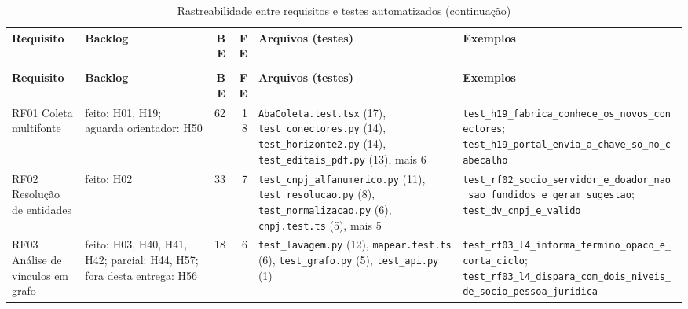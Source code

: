 \begin{scriptsize}
\begin{longtable}{>{\raggedright\arraybackslash}p{2.5cm}>{\raggedright\arraybackslash}p{1.9cm}rr>{\raggedright\arraybackslash}p{3.3cm}>{\raggedright\arraybackslash}p{4.5cm}}
\caption{Rastreabilidade entre requisitos e testes automatizados}\label{tab:rastreabilidade-testes}\\
\hline
\textbf{Requisito} & \textbf{Backlog} & \textbf{BE} & \textbf{FE} & \textbf{Arquivos (testes)} & \textbf{Exemplos} \\ \hline\endfirsthead
\caption[]{Rastreabilidade entre requisitos e testes automatizados (continuação)}\\
\hline
\textbf{Requisito} & \textbf{Backlog} & \textbf{BE} & \textbf{FE} & \textbf{Arquivos (testes)} & \textbf{Exemplos} \\ \hline\endhead
RF01 Coleta multifonte & feito: H01, H19; aguarda orientador: H50 & 62 & 18 & \texttt{AbaColeta.\allowbreak{}test.\allowbreak{}tsx} (17), \texttt{test\_\allowbreak{}conectores.\allowbreak{}py} (14), \texttt{test\_\allowbreak{}horizonte2.\allowbreak{}py} (14), \texttt{test\_\allowbreak{}editais\_\allowbreak{}pdf.\allowbreak{}py} (13), mais 6 & \texttt{test\_\allowbreak{}h19\_\allowbreak{}fabrica\_\allowbreak{}conhece\_\allowbreak{}os\_\allowbreak{}novos\_\allowbreak{}conectores}; \texttt{test\_\allowbreak{}h19\_\allowbreak{}portal\_\allowbreak{}envia\_\allowbreak{}a\_\allowbreak{}chave\_\allowbreak{}so\_\allowbreak{}no\_\allowbreak{}cabecalho} \\
RF02 Resolução de entidades & feito: H02 & 33 & 7 & \texttt{test\_\allowbreak{}cnpj\_\allowbreak{}alfanumerico.\allowbreak{}py} (11), \texttt{test\_\allowbreak{}resolucao.\allowbreak{}py} (8), \texttt{test\_\allowbreak{}normalizacao.\allowbreak{}py} (6), \texttt{cnpj.\allowbreak{}test.\allowbreak{}ts} (5), mais 5 & \texttt{test\_\allowbreak{}rf02\_\allowbreak{}socio\_\allowbreak{}servidor\_\allowbreak{}e\_\allowbreak{}doador\_\allowbreak{}nao\_\allowbreak{}sao\_\allowbreak{}fundidos\_\allowbreak{}e\_\allowbreak{}geram\_\allowbreak{}sugestao}; \texttt{test\_\allowbreak{}dv\_\allowbreak{}cnpj\_\allowbreak{}e\_\allowbreak{}valido} \\
RF03 Análise de vínculos em grafo & feito: H03, H40, H41, H42; parcial: H44, H57; fora desta entrega: H56 & 18 & 6 & \texttt{test\_\allowbreak{}lavagem.\allowbreak{}py} (12), \texttt{mapear.\allowbreak{}test.\allowbreak{}ts} (6), \texttt{test\_\allowbreak{}grafo.\allowbreak{}py} (5), \texttt{test\_\allowbreak{}api.\allowbreak{}py} (1) & \texttt{test\_\allowbreak{}rf03\_\allowbreak{}l4\_\allowbreak{}informa\_\allowbreak{}termino\_\allowbreak{}opaco\_\allowbreak{}e\_\allowbreak{}corta\_\allowbreak{}ciclo}; \texttt{test\_\allowbreak{}rf03\_\allowbreak{}l4\_\allowbreak{}dispara\_\allowbreak{}com\_\allowbreak{}dois\_\allowbreak{}niveis\_\allowbreak{}de\_\allowbreak{}socio\_\allowbreak{}pessoa\_\allowbreak{}juridica} \\

\end{longtable}
\end{scriptsize}
